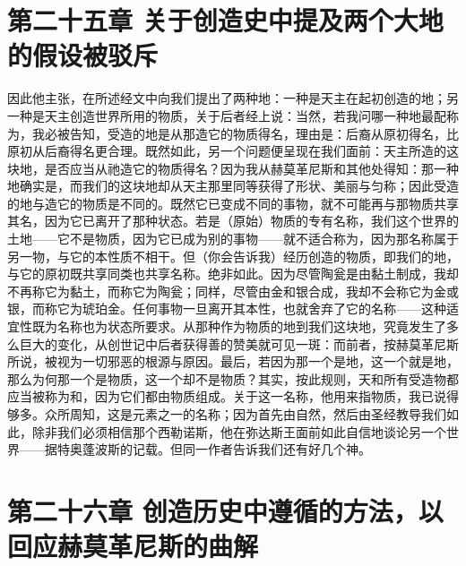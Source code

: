 
\section{第二十五章 关于创造史中提及两个大地的假设被驳斥}

因此他主张，在所述经文中向我们提出了两种地：一种是天主在起初创造的地；另一种是天主创造世界所用的物质，关于后者经上说：当然，若我问哪一种地最配称为，我必被告知，受造的地是从那造它的物质得名，理由是：后裔从原初得名，比原初从后裔得名更合理。既然如此，另一个问题便呈现在我们面前：天主所造的这块地，是否应当从祂造它的物质得名？因为我从赫莫革尼斯和其他处得知：那一种地确实是，而我们的这块地却从天主那里同等获得了形状、美丽与匀称；因此受造的地与造它的物质是不同的。既然它已变成不同的事物，就不可能再与那物质共享其名，因为它已离开了那种状态。若是（原始）物质的专有名称，我们这个世界的土地——它不是物质，因为它已成为别的事物——就不适合称为，因为那名称属于另一物，与它的本性质不相干。但（你会告诉我）经历创造的物质，即我们的地，与它的原初既共享同类也共享名称。绝非如此。因为尽管陶瓮是由黏土制成，我却不再称它为黏土，而称它为陶瓮；同样，尽管由金和银合成，我却不会称它为金或银，而称它为琥珀金。任何事物一旦离开其本性，也就舍弃了它的名称——这种适宜性既为名称也为状态所要求。从那种作为物质的地到我们这块地，究竟发生了多么巨大的变化，从创世记中后者获得善的赞美就可见一斑：而前者，按赫莫革尼斯所说，被视为一切邪恶的根源与原因。最后，若因为那一个是地，这一个就是地，那么为何那一个是物质，这一个却不是物质？其实，按此规则，天和所有受造物都应当被称为和，因为它们都由物质组成。关于这一名称，他用来指物质，我已说得够多。众所周知，这是元素之一的名称；因为首先由自然，然后由圣经教导我们如此，除非我们必须相信那个西勒诺斯，他在弥达斯王面前如此自信地谈论另一个世界——据特奥蓬波斯的记载。但同一作者告诉我们还有好几个神。\par


\section{第二十六章 创造历史中遵循的方法，以回应赫莫革尼斯的曲解}

